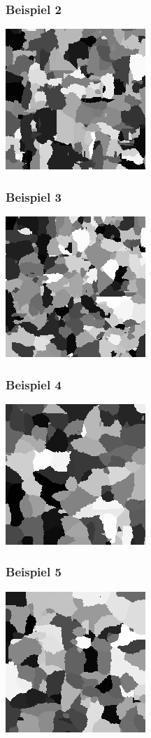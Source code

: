\documentclass[a4paper,10pt,ngerman]{scrartcl}
\begin{document}
\subsubsection{Beispiel 2}
\centerline{\includegraphics{beispiel2}}
\newpage
\subsubsection{Beispiel 3}
\centerline{\includegraphics{beispiel3}}
\subsubsection{Beispiel 4}
\centerline{\includegraphics{beispiel4}}
\newpage
\subsubsection{Beispiel 5}
\centerline{\includegraphics{beispiel5}}
\end{document}
